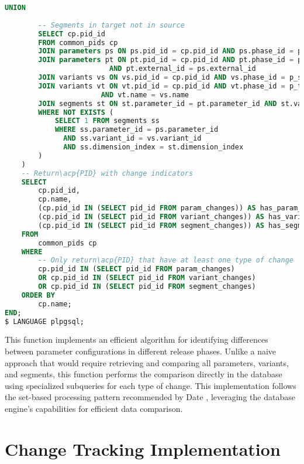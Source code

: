 \begin{lstlisting}[language=SQL, caption={Phase Comparison Function}, label={lst:phase-comparison}]
        UNION
        
        -- Segments in target not in source
        SELECT cp.pid_id
        FROM common_pids cp
        JOIN parameters ps ON ps.pid_id = cp.pid_id AND ps.phase_id = p_source_phase_id
        JOIN parameters pt ON pt.pid_id = cp.pid_id AND pt.phase_id = p_target_phase_id
                         AND pt.external_id = ps.external_id
        JOIN variants vs ON vs.pid_id = cp.pid_id AND vs.phase_id = p_source_phase_id
        JOIN variants vt ON vt.pid_id = cp.pid_id AND vt.phase_id = p_target_phase_id
                       AND vt.name = vs.name
        JOIN segments st ON st.parameter_id = pt.parameter_id AND st.variant_id = vt.variant_id
        WHERE NOT EXISTS (
            SELECT 1 FROM segments ss
            WHERE ss.parameter_id = ps.parameter_id
              AND ss.variant_id = vs.variant_id
              AND ss.dimension_index = st.dimension_index
        )
    )
    -- Return\acp{PID} with change indicators
    SELECT 
        cp.pid_id,
        cp.name,
        (cp.pid_id IN (SELECT pid_id FROM param_changes)) AS has_param_changes,
        (cp.pid_id IN (SELECT pid_id FROM variant_changes)) AS has_variant_changes,
        (cp.pid_id IN (SELECT pid_id FROM segment_changes)) AS has_segment_changes
    FROM 
        common_pids cp
    WHERE
        -- Only return\acp{PID} that have at least one type of change
        cp.pid_id IN (SELECT pid_id FROM param_changes)
        OR cp.pid_id IN (SELECT pid_id FROM variant_changes)
        OR cp.pid_id IN (SELECT pid_id FROM segment_changes)
    ORDER BY 
        cp.name;
END;
$ LANGUAGE plpgsql;
\end{lstlisting}

This function implements an efficient algorithm for identifying differences between parameter configurations in different release phases. Unlike a naive approach that would require retrieving and comparing all parameters, variants, and segments, this function performs the comparison directly in the database using specialized subqueries for each type of change. This implementation follows the set-based processing pattern recommended by Date \cite{date2011sql}, leveraging the database engine's capabilities for efficient data comparison.

\section{Change Tracking Implementation}
\label{sec:change-tracking-implementation}

